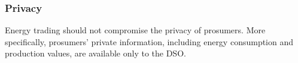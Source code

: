 \subsubsection{Privacy} 
Energy trading should not compromise the privacy of prosumers.
More specifically, prosumers' private information, including energy consumption and production values, are available only to the DSO.


